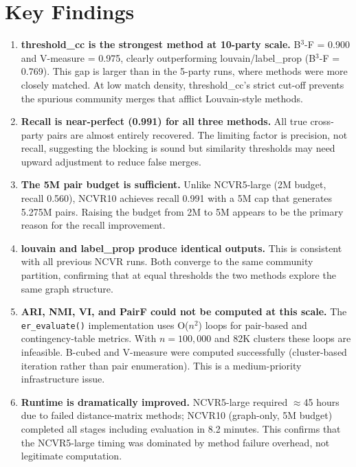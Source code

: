 \documentclass[11pt, a4paper]{article}
\begin{document}
\section{Key Findings}

\begin{enumerate}[leftmargin=*, label=\arabic*.]

  \item \textbf{threshold\_cc is the strongest method at 10-party scale.}
        B$^3$-F = 0.900 and V-measure = 0.975, clearly outperforming louvain/label\_prop
        (B$^3$-F = 0.769). This gap is larger than in the 5-party runs, where methods
        were more closely matched. At low match density, threshold\_cc's strict cut-off
        prevents the spurious community merges that afflict Louvain-style methods.

  \item \textbf{Recall is near-perfect (0.991) for all three methods.}
        All true cross-party pairs are almost entirely recovered. The limiting factor
        is precision, not recall, suggesting the blocking is sound but similarity
        thresholds may need upward adjustment to reduce false merges.

  \item \textbf{The 5M pair budget is sufficient.}
        Unlike NCVR5-large (2M budget, recall 0.560), NCVR10 achieves recall 0.991
        with a 5M cap that generates 5.275M pairs. Raising the budget from 2M to 5M
        appears to be the primary reason for the recall improvement.

  \item \textbf{louvain and label\_prop produce identical outputs.}
        This is consistent with all previous NCVR runs. Both converge to the same
        community partition, confirming that at equal thresholds the two methods
        explore the same graph structure.

  \item \textbf{ARI, NMI, VI, and PairF could not be computed at this scale.}
        The \texttt{er\_evaluate()} implementation uses O($n^2$) loops for pair-based
        and contingency-table metrics. With $n = 100{,}000$ and 82K clusters these loops
        are infeasible. B-cubed and V-measure were computed successfully (cluster-based
        iteration rather than pair enumeration). This is a medium-priority infrastructure
        issue.

  \item \textbf{Runtime is dramatically improved.}
        NCVR5-large required $\approx$45 hours due to failed distance-matrix methods;
        NCVR10 (graph-only, 5M budget) completed all stages including evaluation in
        8.2 minutes. This confirms that the NCVR5-large timing was dominated by method
        failure overhead, not legitimate computation.

\end{enumerate}
\end{document}
